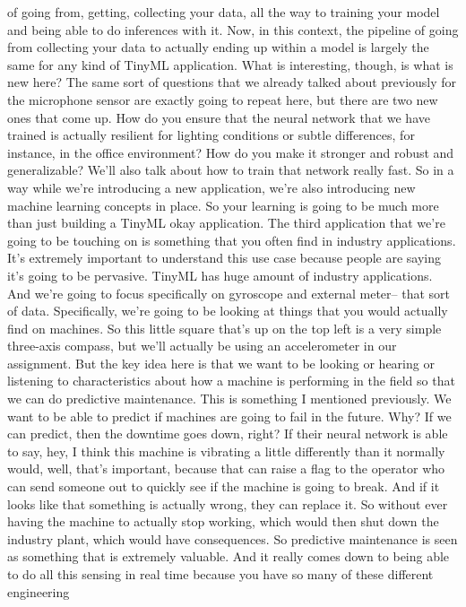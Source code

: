 of going from, getting, collecting your data,
all the way to training your model and being able to do inferences with it.
Now, in this context, the pipeline of going
from collecting your data to actually ending up within a model
is largely the same for any kind of TinyML application.
What is interesting, though, is what is new here?
The same sort of questions that we already talked about previously
for the microphone sensor are exactly going to repeat here,
but there are two new ones that come up.
How do you ensure that the neural network that we have trained
is actually resilient for lighting conditions or subtle differences,
for instance, in the office environment?
How do you make it stronger and robust and generalizable?
We'll also talk about how to train that network really fast.
So in a way while we're introducing a new application,
we're also introducing new machine learning concepts in place.
So your learning is going to be much more than just building a TinyML okay
application.
The third application that we're going to be touching on
is something that you often find in industry applications.
It's extremely important to understand this use case
because people are saying it's going to be pervasive.
TinyML has huge amount of industry applications.
And we're going to focus specifically on gyroscope and external meter--
that sort of data.
Specifically, we're going to be looking at things that you would actually
find on machines.
So this little square that's up on the top left
is a very simple three-axis compass, but we'll actually
be using an accelerometer in our assignment.
But the key idea here is that we want to be looking or hearing or listening
to characteristics about how a machine is performing in the field
so that we can do predictive maintenance.
This is something I mentioned previously.
We want to be able to predict if machines
are going to fail in the future.
Why?
If we can predict, then the downtime goes down, right?
If their neural network is able to say, hey, I
think this machine is vibrating a little differently than it normally
would, well, that's important, because that
can raise a flag to the operator who can send someone out
to quickly see if the machine is going to break.
And if it looks like that something is actually wrong, they can replace it.
So without ever having the machine to actually stop working,
which would then shut down the industry plant, which would have consequences.
So predictive maintenance is seen as something that is extremely valuable.
And it really comes down to being able to do all this sensing in real time
because you have so many of these different engineering
